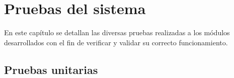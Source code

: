 \chapter{Pruebas del sistema}

En este capítulo se detallan las diversas pruebas realizadas a los módulos desarrollados con el fin de verificar y validar su correcto funcionamiento.

\section{Pruebas unitarias}


